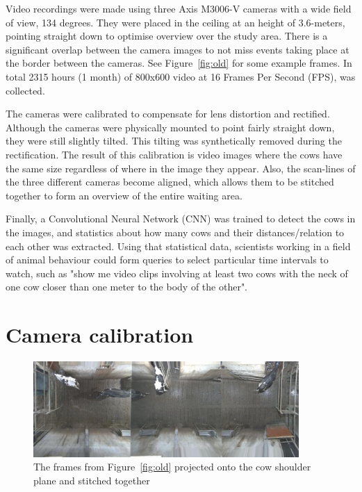 \documentclass{IET}
\begin{document}
Video recordings were made using three Axis M3006-V cameras with a wide field of view, 134 degrees. They were placed in the ceiling at an height of 3.6-meters, pointing straight down to optimise overview over the study area. There is a significant overlap between the camera images to not miss events taking place at the border between the cameras. See Figure~\ref{fig:old} for some example frames. In total 2315 hours (1 month) of 800x600 video at 16 Frames Per Second (FPS), was collected.

The cameras were calibrated to compensate for lens distortion and rectified. Although the cameras were physically mounted to point fairly straight down, they were still slightly tilted. This tilting was synthetically removed during the rectification. The result of this calibration is video images where the cows have the same size regardless of where in the image they appear. Also, the scan-lines of the three different cameras become aligned, which allows them to be stitched together to form an overview of the entire waiting area.

Finally, a Convolutional Neural Network (CNN)  was trained to detect the cows in the images, and statistics about how many cows and their distances/relation to each other was extracted. Using that statistical data, scientists working in a field of animal behaviour could form queries to select particular time intervals to watch, such as "show me video clips involving at least two cows with the neck of one cow closer than one meter to the body of the other".


\section{Camera calibration}

\begin{figure}[t]
\begin{center}
  \includegraphics[width=0.9\textwidth]{full.jpg}
\end{center}
  \caption{The frames from Figure~\ref{fig:old} projected onto the cow shoulder plane and stitched together}
  \label{fig:stitch}
\end{figure}
\end{document}

